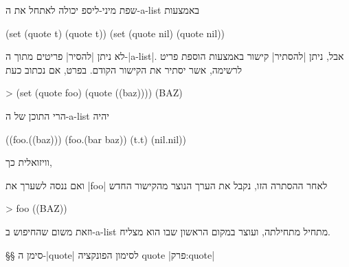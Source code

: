 שפת מיני-ליספ יכולה לאתחל את ה-a-list באמצעות
\begin{LIBRARY}
(set (quote t) (quote t))
(set (quote nil) (quote nil))
\end{LIBRARY}
לא ניתן \ע|להסיר| פריטים מתוך ה-\E|a-list|. אבל, ניתן \ע|להסתיר| קישור באמצעות
הוספת פריט לרשימה, אשר יסתיר את הקישור הקודם. בפרט, אם נכתוב כעת
\begin{LISP}
> (set (quote foo) (quote ((baz))))
(BAZ)
\end{LISP}
הרי התוכן של ה-a-list יהיה
\begin{LISP}
((foo.((baz)))
     (foo.(bar baz))
     (t.t)
     (nil.nil))
\end{LISP}
וויזואלית כך,
\begin{LTR}
\end{LTR}
ואם ננסה לשערך את \T|foo| לאחר ההסתרה הזו, נקבל את הערך הנוצר מהקישור החדש
\begin{LISP}
> foo
((BAZ))
\end{LISP}
וזאת משום שהחיפוש ב-a-list מתחיל מתחילתה, ועוצר במקום הראשון שבו הוא מצליח.

§§ סימן ה-\E|quote| לסימון הפונקציה quote
|פרק:quote|

